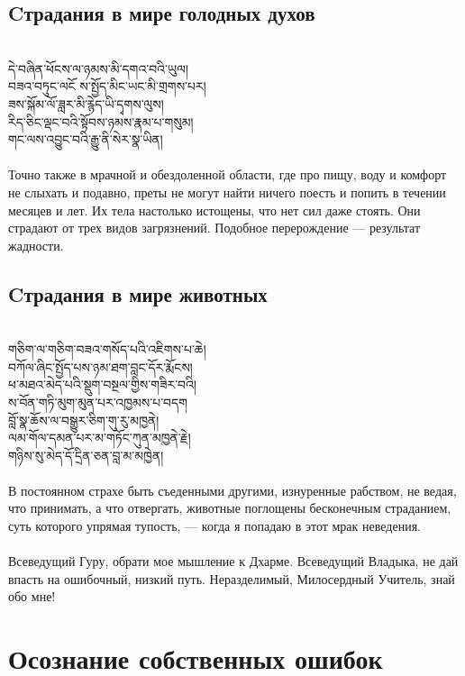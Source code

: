 \subsection*{Cтрадания в мире голодных духов}
\\
\ti
དེ་བཞིན་ཕོངས་ལ་ཉམས་མི་དགའ་བའི་ཡུལ།\\
བཟའ་བཏུང་ལངོ ས་སྤྱོད་མིང་ཡང་མི་གྲགས་པར། \\
ཟས་སྐོམ་ལོ་ཟླར་མི་རྙེད་ཡི་དྭགས་ལུས། \\
རིད་ཅིང་ལྡང་བའི་སྟོབས་ཉམས་རྣམ་པ་གསུམ། \\
གང་ལས་འབྱུང་བའི་རྒྱུ་ནི་སེར་སྣ་ཡིན།\\
\\
\ru
Точно также в мрачной и обездоленной области,
где про пищу, воду и комфорт не слыхать и подавно,
преты не могут найти ничего поесть и попить в течении месяцев и лет.
Их тела настолько истощены, что нет сил даже стоять.
Они страдают от трех видов загрязнений.
Подобное перерождение — результат жадности.

\subsection*{Cтрадания в мире животных}
\\
\ti
གཅིག་ལ་གཅིག་བཟའ་གསོད་པའི་འཇིགས་པ་ཆེ།\\
བཀོལ་ཞིང་སྤྱོད་པས་ཉམ་ཐག་བླང་དོར་རྨོངས། \\
ཕ་མཐའ་མེད་པའི་སྡུག་བསྔལ་གྱིས་གཟིར་བའི། \\
ས་བོན་གཏི་མུག་མུན་པར་འཁྱམས་པ་བདག \\
བློ་སྣ་ཆོས་ལ་བསྒྱུར་ཅིག་གུ་རུ་མཁྱནེ། \\
ལམ་གོལ་དམན་པར་མ་གཏོང་ཀུན་མཁྱནེ་རྗེ། \\
གཉིས་སུ་མེད་དོ་དྲིན་ཅན་བླ་མ་མཁྱེན།\\
\\
\ru
В постоянном страхе быть съеденными другими,
изнуренные рабством, не ведая, что принимать, а что отвергать,
животные поглощены бесконечным страданием,
суть которого упрямая тупость, — когда я попадаю в этот мрак неведения.\\
\\
Всеведущий Гуру, обрати мое мышление к Дхарме.
Всеведущий Владыка, не дай впасть на ошибочный, низкий путь.
Нераздели\-мый, Милосердный Учитель, знай обо мне!

\section*{Осознание собственных ошибок}

